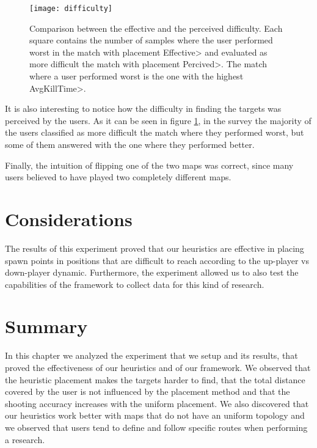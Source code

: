 \begin{figure}
\centering
\texttt{[image: difficulty]}
\caption[Comparison between the effective and the perceived difficulty.]{Comparison between the effective and the perceived difficulty. Each square contains the number of samples where the user performed worst in the match with placement \<Effective> and evaluated as more difficult the match with placement \<Percived>. The match where a user performed worst is the one with the highest \<AvgKillTime>.}
\label{img:percived} 
\end{figure}

It is also interesting to notice how the difficulty in finding the targets was perceived by the users. As it can be seen in figure \ref{img:percived}, in the survey the majority of the users classified as more difficult the match where they performed worst, but some of them answered with the one where they performed better. 

\par

Finally, the intuition of flipping one of the two maps was correct, since many users believed to have played two completely different maps. 


\section{Considerations}

The results of this experiment proved that our heuristics are effective in placing spawn points in positions that are difficult to reach according to the up-player vs down-player dynamic. Furthermore, the experiment allowed us to also test the capabilities of the framework to collect data for this kind of research.


\section{Summary}

In this chapter we analyzed the experiment that we setup and its results, that proved the effectiveness of our heuristics and of our framework. We observed that the heuristic placement makes the targets harder to find, that the total distance covered by the user is not influenced by the placement method and that the shooting accuracy increases with the uniform placement. We also discovered that our heuristics work better with maps that do not have an uniform topology and we observed that users tend to define and follow specific routes when performing a research.